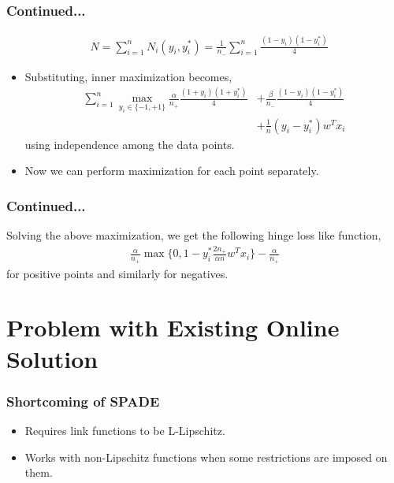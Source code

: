 \documentclass{beamer}
\begin{document}
\begin{frame}
	\frametitle{Continued...}
	\begin{align*}
	&N = \sum_{i=1}^nN_i(y_i,y_i^*)= \frac{1}{n_-}\sum_{i=1}^n\frac{(1-y_i)(1-y_i^*)}{4}
	\end{align*}
	\begin{itemize}
	\item Substituting, inner maximization becomes,
	\begin{align*}
	\sum_{i=1}^n\max_{y_i\in\{-1,+1\}}\frac{\alpha}{n_+}\frac{(1+y_i)(1+y_i^*)}{4} &+\frac{\beta}{n_-}\frac{(1-y_i)(1-y_i^*)}{4} \\
	&+ \frac{1}{n}(y_i - y_i^*)w^Tx_i
	\end{align*}
	using independence among the data points.
	\item Now we can perform maximization for each point separately.
	\end{itemize}
\end{frame}
\begin{frame}
	\frametitle{Continued...}
	Solving the above maximization, we get the following hinge loss like function,
	\begin{align*}
	\frac{\alpha}{n_+}\max\{0,1-y_i^*\frac{2n_+}{\alpha n}w^Tx_i\} - \frac{\alpha}{n_+}
	\end{align*}
	for positive points and similarly for negatives.
\end{frame}

\section{Problem with Existing Online Solution} %

\begin{frame}
	\frametitle{Shortcoming of SPADE}
	\begin{itemize}
		\item Requires link functions to be L-Lipschitz.
		\item Works with non-Lipschitz functions when some restrictions are imposed on them.
	\end{itemize}
\end{frame}
\end{document}
